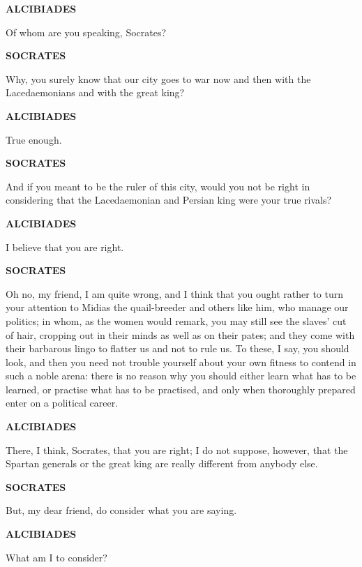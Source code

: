 \documentclass[11pt,letter]{article}
\begin{document}
\par \textbf{ALCIBIADES}
\par   Of whom are you speaking, Socrates?

\par \textbf{SOCRATES}
\par   Why, you surely know that our city goes to war now and then with the Lacedaemonians and with the great king?

\par \textbf{ALCIBIADES}
\par   True enough.

\par \textbf{SOCRATES}
\par   And if you meant to be the ruler of this city, would you not be right in considering that the Lacedaemonian and Persian king were your true rivals?

\par \textbf{ALCIBIADES}
\par   I believe that you are right.

\par \textbf{SOCRATES}
\par   Oh no, my friend, I am quite wrong, and I think that you ought rather to turn your attention to Midias the quail-breeder and others like him, who manage our politics; in whom, as the women would remark, you may still see the slaves' cut of hair, cropping out in their minds as well as on their pates; and they come with their barbarous lingo to flatter us and not to rule us. To these, I say, you should look, and then you need not trouble yourself about your own fitness to contend in such a noble arena:  there is no reason why you should either learn what has to be learned, or practise what has to be practised, and only when thoroughly prepared enter on a political career.

\par \textbf{ALCIBIADES}
\par   There, I think, Socrates, that you are right; I do not suppose, however, that the Spartan generals or the great king are really different from anybody else.

\par \textbf{SOCRATES}
\par   But, my dear friend, do consider what you are saying.

\par \textbf{ALCIBIADES}
\par   What am I to consider?
\end{document}

